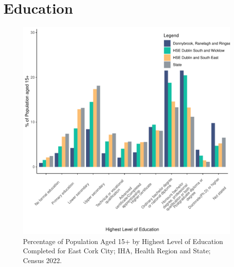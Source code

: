 \documentclass{article}
\begin{document}
\section{Education}\label{sect:Edu}
\begin{figure}[H]
	\centering
	\includegraphics[width = 120mm]{../figures/EduED.pdf}
	\caption{Percentage of Population Aged 15+ by Highest Level of Education Completed for East Cork City; IHA, Health Region and State; Census 2022.}
	\label{fig:vbnv}
	\end{figure}
\end{document}
